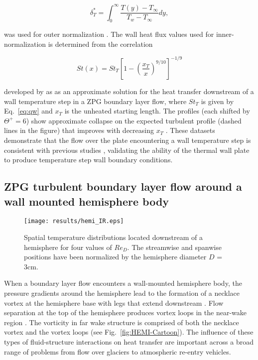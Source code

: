 \begin{equation}
\delta_T^* = \int_0^\infty \frac{T(y) - T_\infty}{T_w - T_\infty} dy,
\end{equation}

\noindent was used for outer normalization \cite{Antonia1977}.  The wall heat flux values used for inner-normalization is determined from the correlation 

\begin{equation}
St(x) = St_T \left[ 1 - \left(\frac{x_T}{x}\right)^{9/10}\right]^{-1/9}
\label{eq:st_correction}
\end{equation}

\noindent developed by \cite{Reynolds1958} as as an approximate solution for the heat transfer downstream of a wall temperature step in a ZPG boundary layer flow, where $St_T$ is given by Eq.~\ref{eq:qw} and $x_T$ is the unheated starting length. 
The profiles (each shifted by $\Theta^+ = 6$) show approximate collapse on the expected turbulent profile (dashed lines in the figure) that improves with decreasing $x_T$ . 
These datasets demonstrate that the flow over the plate encountering a wall temperature step is consistent with previous studies \cite{Reynolds1958, Hoffmann1979}, validating the ability of the thermal wall plate to produce temperature step wall boundary conditions.



\subsection{ZPG turbulent boundary layer flow around a wall mounted hemisphere body}

\begin{figure}[h!]
\centering
\texttt{[image: results/hemi\_IR.eps]}
\caption{Spatial temperature distributions located downstream of a hemisphere for four values of $Re_D$. The streamwise and spanwise positions have been normalized by the hemisphere diameter $D$ = 3cm.} 
\label{fig:IR-HEMI}
\end{figure}

When a boundary layer flow encounters a wall-mounted hemisphere body, the pressure gradients around the hemisphere lead to the formation of a necklace vortex at the hemisphere base with legs that extend downstream \cite{simpson2001}. 
Flow separation at the top of the hemisphere produces vortex loops in the near-wake region \cite{Savory1986,Hansen1975}.
The vorticity in far wake structure is comprised of both the necklace vortex and the vortex loops (see Fig.~\ref{fig:HEMI-Cartoon}). 
The influence of these types of fluid-structure interactions on heat transfer are important across a broad range of problems from flow over glaciers to atmospheric re-entry vehicles. 

